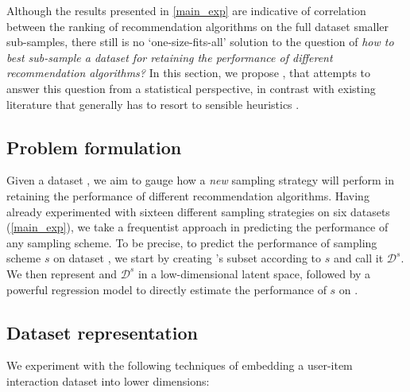 Although the results presented in \cref{main_exp} are indicative of correlation between the ranking of recommendation algorithms on the full dataset \vs smaller sub-samples, there still is no `one-size-fits-all' solution to the question of \emph{how to best sub-sample a dataset for retaining the performance of different recommendation algorithms?} In this section, we propose \oracle, that attempts to answer this question from a statistical perspective, in contrast with existing literature that generally has to resort to sensible heuristics \cite{large_graphs, scaling_up, sampling_cf_nn}.

\subsection{Problem formulation}
Given a dataset \dataset, we aim to gauge how a \emph{new} sampling strategy will perform in retaining the performance of different recommendation algorithms. Having already experimented with sixteen different sampling strategies on six datasets (\cref{main_exp}), we take a frequentist approach in predicting the performance of any sampling scheme. To be precise, to predict the performance of sampling scheme $s$ on dataset \dataset, we start by creating \dataset's subset according to $s$ and call it $\mathcal{D}^s$. We then represent \dataset and $\mathcal{D}^s$ in a low-dimensional latent space, followed by a powerful regression model to directly estimate the performance of $s$ on \dataset.

\subsection{Dataset representation} \label{data_rep}
We experiment with the following techniques of embedding a user-item interaction dataset into lower dimensions:

